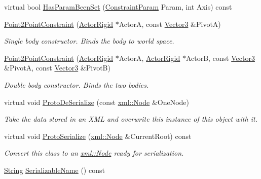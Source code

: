 \begin{DoxyCompactItemize}
virtual bool \hyperlink{classphys_1_1Point2PointConstraint_a37ba19abafb1fad5a898b22cdd792129}{HasParamBeenSet} (\hyperlink{namespacephys_aa1e7cf2d7efcaeaeac304f711e7564e8}{ConstraintParam} Param, int Axis) const 
\item 
\hyperlink{classphys_1_1Point2PointConstraint_a64806b50332492d3342884f40e7871fb}{Point2PointConstraint} (\hyperlink{classphys_1_1ActorRigid}{ActorRigid} $\ast$ActorA, const \hyperlink{classphys_1_1Vector3}{Vector3} \&PivotA)
\begin{DoxyCompactList}\small\item\em Single body constructor. Binds the body to world space. \item\end{DoxyCompactList}\item 
\hyperlink{classphys_1_1Point2PointConstraint_a890c02b69d2b477e5e7c638c36a8c84d}{Point2PointConstraint} (\hyperlink{classphys_1_1ActorRigid}{ActorRigid} $\ast$ActorA, \hyperlink{classphys_1_1ActorRigid}{ActorRigid} $\ast$ActorB, const \hyperlink{classphys_1_1Vector3}{Vector3} \&PivotA, const \hyperlink{classphys_1_1Vector3}{Vector3} \&PivotB)
\begin{DoxyCompactList}\small\item\em Double body constructor. Binds the two bodies. \item\end{DoxyCompactList}\item 
virtual void \hyperlink{classphys_1_1Point2PointConstraint_a1ba1bd6cc8d16c69579633f0a5b28b6d}{ProtoDeSerialize} (const \hyperlink{classphys_1_1xml_1_1Node}{xml::Node} \&OneNode)
\begin{DoxyCompactList}\small\item\em Take the data stored in an XML and overwrite this instance of this object with it. \item\end{DoxyCompactList}\item 
virtual void \hyperlink{classphys_1_1Point2PointConstraint_ace2e182da3c1495084eea1a5fcc97cfd}{ProtoSerialize} (\hyperlink{classphys_1_1xml_1_1Node}{xml::Node} \&CurrentRoot) const 
\begin{DoxyCompactList}\small\item\em Convert this class to an \hyperlink{classphys_1_1xml_1_1Node}{xml::Node} ready for serialization. \item\end{DoxyCompactList}\item 
\hyperlink{namespacephys_aa03900411993de7fbfec4789bc1d392e}{String} \hyperlink{classphys_1_1Point2PointConstraint_ae658c1f5c370b8a4cf94fcf276696dbf}{SerializableName} () const 

\end{DoxyCompactItemize}
